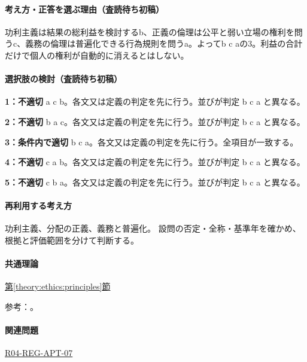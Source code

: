 \paragraph{考え方・正答を選ぶ理由（査読待ち初稿）} 功利主義は結果の総利益を検討するb、正義の倫理は公平と弱い立場の権利を問うc、義務の倫理は普遍化できる行為規則を問うa。よってb c aの3。利益の合計だけで個人の権利が自動的に消えるとはしない。

\paragraph{選択肢の検討（査読待ち初稿）}\mbox{}\par

\noindent\textbf{1：不適切} a c b。各文又は定義の判定を先に行う。並びが判定 b c a と異なる。\par

\noindent\textbf{2：不適切} b a c。各文又は定義の判定を先に行う。並びが判定 b c a と異なる。\par

\noindent\textbf{3：条件内で適切} b c a。各文又は定義の判定を先に行う。全項目が一致する。\par

\noindent\textbf{4：不適切} c a b。各文又は定義の判定を先に行う。並びが判定 b c a と異なる。\par

\noindent\textbf{5：不適切} c b a。各文又は定義の判定を先に行う。並びが判定 b c a と異なる。\par

\paragraph{再利用する考え方} 功利主義、分配の正義、義務と普遍化。 設問の否定・全称・基準年を確かめ、根拠と評価範囲を分けて判断する。

\paragraph{共通理論} \hyperref[theory:ethics:principles]{第\ref*{theory:ethics:principles}節}

\par 参考：\cite{scu_ethics_framework}。

\paragraph{関連問題} \hyperref[q:r04-reg-apt-07]{R04-REG-APT-07}


